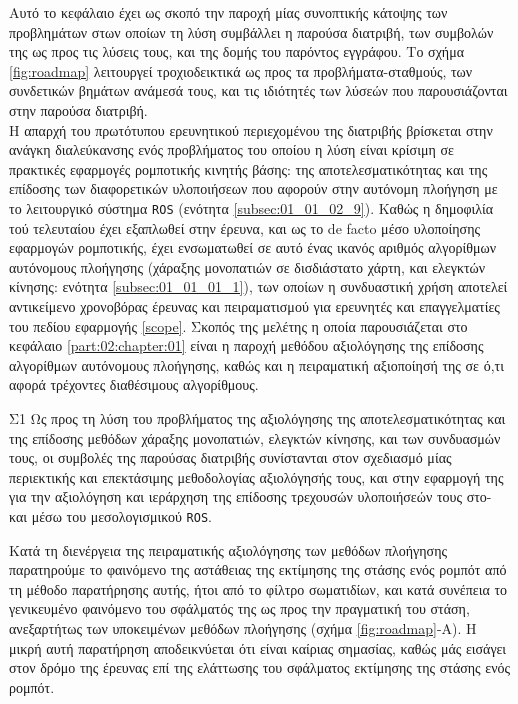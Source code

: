 Αυτό το κεφάλαιο έχει ως σκοπό την παροχή μίας συνοπτικής κάτοψης των
προβλημάτων στων οποίων τη λύση συμβάλλει η παρούσα διατριβή, των συμβολών της
ως προς τις λύσεις τους, και της δομής του παρόντος εγγράφου. Το σχήμα
\ref{fig:roadmap} λειτουργεί τροχιοδεικτικά ως προς τα προβλήματα-σταθμούς, των
συνδετικών βημάτων ανάμεσά τους, και τις ιδιότητές των λύσεών που παρουσιάζονται
στην παρούσα διατριβή.\\

Η απαρχή του πρωτότυπου ερευνητικού περιεχομένου της διατριβής βρίσκεται στην
ανάγκη διαλεύκανσης ενός προβλήματος του οποίου η λύση είναι κρίσιμη σε
πρακτικές εφαρμογές ρομποτικής κινητής βάσης: της αποτελεσματικότητας και της
επίδοσης των διαφορετικών υλοποιήσεων που αφορούν στην αυτόνομη πλοήγηση με το
λειτουργικό σύστημα \texttt{ROS} (ενότητα \ref{subsec:01_01_02_9}). Καθώς η
δημοφιλία τού τελευταίου έχει εξαπλωθεί στην έρευνα, και ως το de facto μέσο
υλοποίησης εφαρμογών ρομποτικής, έχει ενσωματωθεί σε αυτό ένας ικανός αριθμός
αλγορίθμων αυτόνομους πλοήγησης (χάραξης μονοπατιών σε δισδιάστατο χάρτη, και
ελεγκτών κίνησης: ενότητα \ref{subsec:01_01_01_1}), των οποίων η συνδυαστική
χρήση αποτελεί αντικείμενο χρονοβόρας έρευνας και πειραματισμού για ερευνητές
και επαγγελματίες του πεδίου εφαρμογής \ref{scope}. Σκοπός της μελέτης η οποία
παρουσιάζεται στο κεφάλαιο \ref{part:02:chapter:01} είναι η παροχή μεθόδου
αξιολόγησης της επίδοσης αλγορίθμων αυτόνομους πλοήγησης, καθώς και η
πειραματική αξιοποίησή της σε ό,τι αφορά τρέχοντες διαθέσιμους αλγορίθμους.

\begin{bw_box}
\begin{customcontribution}{Σ1}
  \label{contribution:01}
  Ως προς τη λύση του προβλήματος της αξιολόγησης της αποτελεσματικότητας και
  της επίδοσης μεθόδων χάραξης μονοπατιών, ελεγκτών κίνησης, και των συνδυασμών
  τους, οι συμβολές της παρούσας διατριβής συνίστανται στον σχεδιασμό μίας
  περιεκτικής και επεκτάσιμης μεθοδολογίας αξιολόγησής τους, και στην εφαρμογή
  της για την αξιολόγηση και ιεράρχηση της επίδοσης τρεχουσών υλοποιήσεών τους
  στο- και μέσω του μεσολογισμικού \texttt{ROS}. \cite{Filotheou2020b}
\end{customcontribution}
\end{bw_box}

Κατά τη διενέργεια της πειραματικής αξιολόγησης των μεθόδων πλοήγησης
παρατηρούμε το φαινόμενο της αστάθειας της εκτίμησης της στάσης ενός ρομπότ από
τη μέθοδο παρατήρησης αυτής, ήτοι από το φίλτρο σωματιδίων, και κατά συνέπεια
το γενικευμένο φαινόμενο του σφάλματός της ως προς την πραγματική του στάση,
ανεξαρτήτως των υποκειμένων μεθόδων πλοήγησης (σχήμα \ref{fig:roadmap}-Α). Η
μικρή αυτή παρατήρηση αποδεικνύεται ότι είναι καίριας σημασίας, καθώς μάς
εισάγει στον δρόμο της έρευνας επί της ελάττωσης του σφάλματος εκτίμησης της
στάσης ενός ρομπότ.\\

